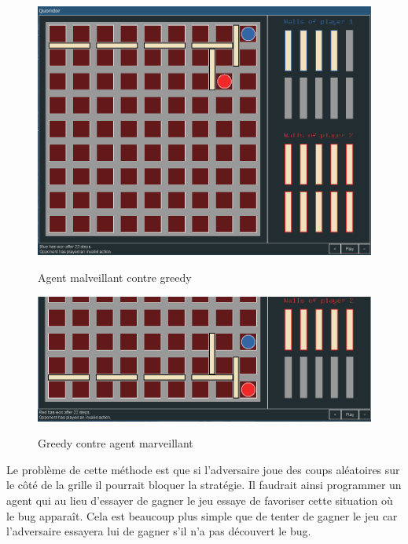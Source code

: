 \documentclass[12pt]{article}
\begin{document}
\begin{figure}[H]
	\centering
	\caption{Agent malveillant contre greedy}
	\includegraphics[width=0.75\paperwidth]{images/myplayer_vs_greedy.png}
    	\label{fig:arch1}
\end{figure}

\begin{figure}[H]
	\centering
	\caption{Greedy contre agent marveillant}
	\includegraphics[width=0.75\paperwidth]{images/greedy_vs_myplayer.png}
  \label{fig:arch2}
\end{figure}

Le problème de cette méthode est que si l'adversaire joue des coups aléatoires sur le côté de la grille il pourrait bloquer la stratégie. Il faudrait ainsi programmer un agent qui au lieu d'essayer de gagner le jeu essaye de favoriser cette situation où le bug apparaît. Cela est beaucoup plus simple que de tenter de gagner le jeu car l'adversaire essayera lui de gagner s'il n'a pas découvert le bug. 
\end{document}
